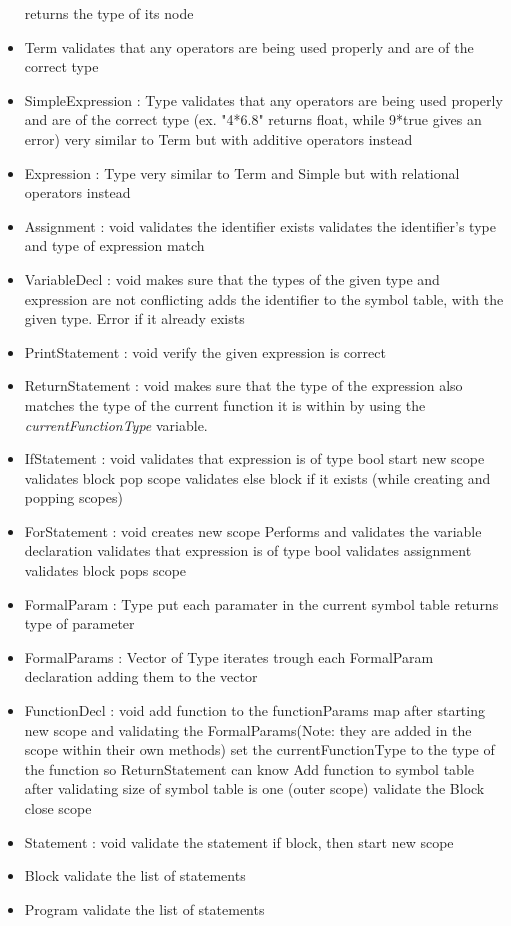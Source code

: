 \begin{itemize}
		\subitem returns the type of its node
	\item Term
		\subitem validates that any operators are being used properly and are of the correct type
	\item SimpleExpression : Type
		\subitem validates that any operators are being used properly and are of the correct type (ex. "4*6.8" returns float, while 9*true gives an error)
		\subitem very similar to Term but with additive operators instead
	\item Expression : Type
		\subitem very similar to Term and Simple but with relational operators instead
	\item Assignment : void
		\subitem validates the identifier exists
		\subitem validates the identifier's type and type of expression match
	\item VariableDecl : void
		\subitem makes sure that the types of the given type and expression are not conflicting
		\subitem adds the identifier to the symbol table, with the given type. Error if it already exists
	\item PrintStatement : void
		\subitem verify the given expression is correct
	\item ReturnStatement : void
		\subitem makes sure that the type of the expression also matches the type of the current function it is within by using the \textit{currentFunctionType} variable.
	\item IfStatement : void
		\subitem validates that expression is of type bool
		\subitem start new scope
		\subitem validates block
		\subitem pop scope
		\subitem validates else block if it exists (while creating and popping scopes)
	\item ForStatement : void
		\subitem creates new scope
		\subitem Performs and validates the variable declaration
		\subitem validates that expression is of type bool
		\subitem validates assignment
		\subitem validates block
		\subitem pops scope
	\item FormalParam : Type
		\subitem put each paramater in the current symbol table
		\subitem returns type of parameter
	\item FormalParams : Vector of Type
		\subitem iterates trough each FormalParam declaration adding them to the vector
	\item FunctionDecl : void
		\subitem add function to the functionParams map after starting new scope and  validating the FormalParams(Note: they are added in the scope within their own methods)
		\subitem set the currentFunctionType to the type of the function so ReturnStatement can know
		Add function to symbol table after validating size of symbol table is one (outer scope)
		\subitem validate the Block
		\subitem close scope
	\item Statement : void
		\subitem validate the statement
		\subitem if block, then start new scope
	\item Block
		\subitem validate the list of statements
	\item Program
		\subitem validate the list of statements
\end{itemize}


